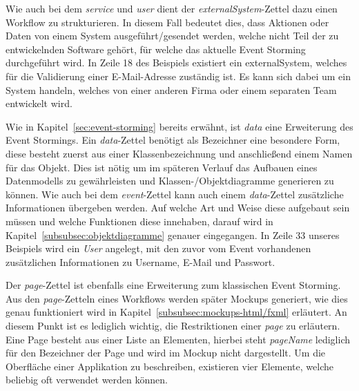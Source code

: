 
Wie auch bei dem \textit{service} und \textit{user} dient der \textit{externalSystem}-Zettel dazu einen Workflow zu strukturieren.
In diesem Fall bedeutet dies, dass Aktionen oder Daten von einem System ausgeführt/gesendet werden, welche nicht Teil der zu entwickelnden
Software gehört, für welche das aktuelle Event Storming durchgeführt wird.
In Zeile 18 des Beispiels existiert ein externalSystem, welches für die Validierung einer E-Mail-Adresse zuständig ist.
Es kann sich dabei um ein System handeln, welches von einer anderen Firma oder einem separaten Team entwickelt wird.


Wie in Kapitel~\ref{sec:event-storming} bereits erwähnt, ist \textit{data} eine Erweiterung des Event Stormings.
Ein \textit{data}-Zettel benötigt als Bezeichner eine besondere Form, diese besteht zuerst aus einer Klassenbezeichnung und anschließend einem Namen für das Objekt.
Dies ist nötig um im späteren Verlauf das Aufbauen eines Datenmodells zu gewährleisten und Klassen-/Objektdiagramme generieren zu können.
Wie auch bei dem \textit{event}-Zettel kann auch einem \textit{data}-Zettel zusätzliche Informationen übergeben werden.
Auf welche Art und Weise diese aufgebaut sein müssen und welche Funktionen diese innehaben, darauf wird in Kapitel~\ref{subsubsec:objektdiagramme} genauer eingegangen.
In Zeile 33 unseres Beispiels wird ein \textit{User} angelegt, mit den zuvor vom Event vorhandenen zusätzlichen Informationen zu Username, E-Mail und Passwort.


Der \textit{page}-Zettel ist ebenfalls eine Erweiterung zum klassischen Event Storming.
Aus den \textit{page}-Zetteln eines Workflows werden später Mockups generiert, wie dies genau funktioniert wird in Kapitel~\ref{subsubsec:mockups-html/fxml} erläutert.
An diesem Punkt ist es lediglich wichtig, die Restriktionen einer \textit{page} zu erläutern.
Eine Page besteht aus einer Liste an Elementen, hierbei steht \textit{pageName} lediglich für den Bezeichner der Page und wird im Mockup nicht dargestellt.
Um die Oberfläche einer Applikation zu beschreiben, existieren vier Elemente, welche beliebig oft verwendet werden können.

